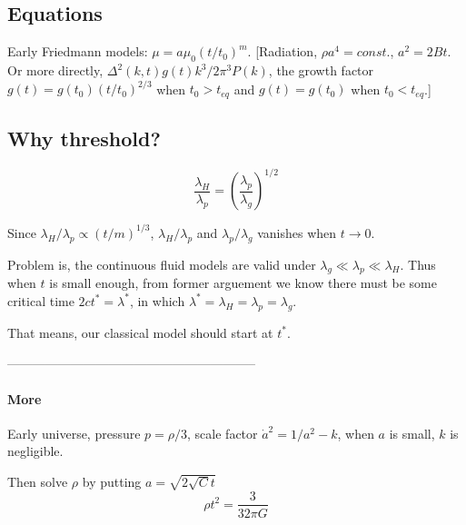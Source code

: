 \documentclass{article}
\begin{document}
\subsection{Equations}

Early Friedmann models: $\mu=a\mu_0(t/t_0)^m$. [Radiation, $\rho a^4=const.$, $a^2=2Bt$. Or more directly, $\Delta^2(k,t)g(t)k^3/2\pi^3P(k)$, the growth factor $g(t)=g(t_0)(t/t_0)^{2/3}$ when $t_0>t_{eq}$ and $g(t)=g(t_0)$ when $t_0<t_{eq}$.]










\setcounter{section}{1}
\subsection{Why threshold?} 


\begin{equation}
\frac{\lambda_H}{\lambda_p}=(\frac{\lambda_p}{\lambda_g})^{1/2}
\end{equation}

Since $\lambda_H/\lambda_p \propto (t/m)^{1/3}$, $\lambda_H/\lambda_p$ and $\lambda_p/\lambda_g$ vanishes when $t\rightarrow 0$.

Problem is, the continuous fluid models are valid under $\lambda_g \ll \lambda_p \ll \lambda_H$. Thus when $t$ is small enough, from former arguement we know there must be some critical time $2ct^*=\lambda^*$, in which $\lambda^*=\lambda_H=\lambda_p=\lambda_g$.

That means, our classical model should start at $t^*$.

\begin{center}-----------------------------------------------------------\end{center}
\paragraph{More}
Early universe, pressure $p=\rho/3$, scale factor $\dot a^2=1/a^2-k$, when $a$ is small, $k$ is negligible.

Then solve $\rho$ by putting $a=\sqrt{2\sqrt{C}t}$
\begin{equation}
\rho t^2=\frac{3}{32\pi G}
\end{equation}
\end{document}
